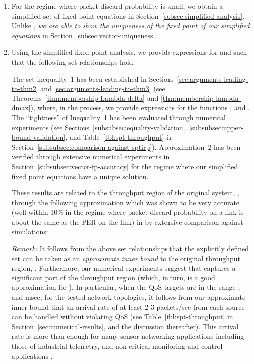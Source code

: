 \documentclass[12pt, draftclsnofoot, onecolumn]{IEEEtran}
\newcommand{\remark}[1]{{\emph{Remark:}} #1}
\newcommand{\gap}{\vspace{2mm}}
\begin{document}
\begin{enumerate}
\item For the regime where packet discard probability is small, we obtain a simplified set of fixed point equations in Section~\ref{subsec:simplified-analysis}. Unlike \cite{srivastava}, \emph{we are able to show the uniqueness of the fixed point of our simplified equations} in Section~\ref{subsec:vector-uniqueness}.

\item Using the simplified fixed point analysis, we provide expressions for  and  such that the following set relationships hold:



The set inequality~1 has been established in Sections~\ref{sec:arguments-leading-to-thm2} and \ref{sec:arguments-leading-to-thm3} (see Theorems~\ref{thm:membership-Lambda-delta} and \ref{thm:membership-lambda-dmax}), where, in the process, we provide expressions for the functions , and . The ``tightness'' of Inequality~1 has been evaluated through numerical experiments (see Sections~\ref{subsubsec:equality-validation}, \ref{subsubsec:upper-bound-validation}, and Table~\ref{tbl:spt-throughput} in Section~\ref{subsubsec:comparison-against-sptirp}). Approximation~2 has been verified through extensive numerical experiments in Section~\ref{subsubsec:vector-fp-accuracy} for the regime where our simplified fixed point equations have a unique solution. 

These results are related to the throughput region of the original system, , through the following approximation which was shown to be very accurate (well within 10\% in the regime where packet discard probability on a link is about the same as the PER on the link) in \cite{srivastava} by extensive comparison against simulations:



\gap
\noindent
\remark It follows from the above set relationships that the explicitly defined set  can be taken as an \emph{approximate inner bound} to the original throughput region, . Furthermore, our numerical experiments suggest that  captures a significant part of the throughput region  (which, in turn, is a good approximation for ). In particular, when the QoS targets are in the range , and  msec, for the tested network topologies, it follows from our approximate inner bound that an arrival rate of at least 2-3 packets/sec from each source can be handled without violating QoS (see Table~\ref{tbl:spt-throughput} in Section~\ref{sec:numerical-results}, and the discussion thereafter). This arrival rate is more than enough for many sensor networking applications including those of industrial telemetry, and non-critical monitoring and control applications \cite{telemetry1,telemetry2}.


\end{enumerate}
\end{document}
